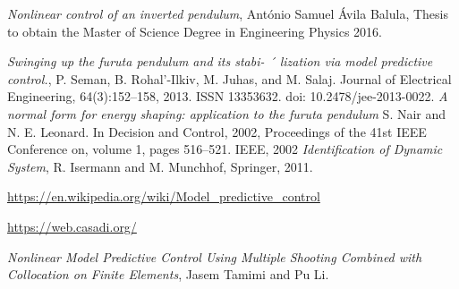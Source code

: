 \documentclass[a4paper,11pt]{article}
\theoremstyle{definition} \newtheorem{deff}{Definicija}[section]
\theoremstyle{definition} \newtheorem{prim}[deff]{Primer}
\theoremstyle{plain} \newtheorem{teor}[deff]{Teorema}
\begin{document}
	\begin{thebibliography}{9}
		\emph{Nonlinear control of an inverted pendulum}, António Samuel Ávila Balula, Thesis to obtain the Master of Science Degree in
		Engineering Physics 2016.
		
		\emph{Swinging up the furuta pendulum and its stabi- ´
			lization via model predictive control.}, P. Seman, B. Rohal’-Ilkiv, M. Juhas, and M. Salaj.  Journal of Electrical Engineering, 64(3):152–158, 2013. ISSN
		13353632. doi: 10.2478/jee-2013-0022.
		\emph{A normal form for energy shaping: application to the furuta pendulum}
		S. Nair and N. E. Leonard. 
		In Decision and Control, 2002, Proceedings of the 41st IEEE Conference on, volume 1, pages
		516–521. IEEE, 2002
		\emph{Identification of Dynamic System}, R. Isermann and M. Munchhof, Springer, 2011.
		
		\url{https://en.wikipedia.org/wiki/Model_predictive_control}
		
		\url{https://web.casadi.org/}
		
		\emph{Nonlinear Model Predictive Control Using Multiple Shooting Combined with 
		Collocation on Finite Elements}, Jasem Tamimi and Pu Li.
		
	\end{thebibliography}
\end{document}
